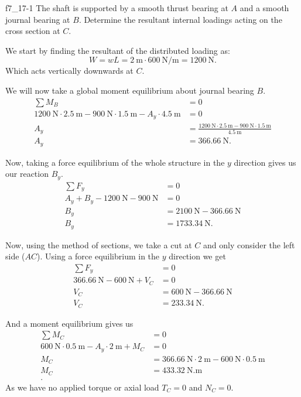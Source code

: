 
\begin{problemwithimage}{f7_1}{7-1}
  The shaft is supported by a smooth thrust bearing at $A$ and a smooth journal bearing at $B$.
  Determine the resultant internal loadings acting on the cross section at $C$.
\end{problemwithimage}

\begin{derivation}
  We start by finding the resultant of the distributed loading as:
  \begin{equation*}
    W = w L = \qty{2}{\m} \cdot \qty{600}{\N\per\m}  = \qty{1200}{\N}
  .\end{equation*}
  Which acts vertically downwards at $C$.

  We will now take a global moment equilibrium about journal bearing $B$.
  \begin{align*}
    \sum M_B &= 0 \\
    \qty{1200}{\N} \cdot \qty{2.5}{\m} - \qty{900}{\N} \cdot \qty{1.5}{\m} - A_y \cdot \qty{4.5}{\m} &= 0 \\
    A_y &= \frac{\qty{1200}{\N} \cdot \qty{2.5}{\m} - \qty{900}{\N} \cdot \qty{1.5}{\m} }{\qty{4.5}{\m} } \\
    A_y &= \qty{366,66}{\N}
  .\end{align*}

  Now, taking a force equilibrium of the whole structure in the $y$ direction gives us our reaction $B_y$.
  \begin{align*}
    \sum F_y &= 0 \\
    A_y + B_y - \qty{1200}{\N} - \qty{900}{\N} &= 0 \\
    B_y &= \qty{2100}{\N} - \qty{366.66}{\N} \\
    B_y &= \qty{1733,34}{\N}
  .\end{align*}

  Now, using the method of sections, we take a cut at $C$ and only consider the left side ($AC$).
  Using a force equilibrium in the $y$ direction we get
  \begin{align*}
    \sum F_y &= 0 \\
    \qty{366.66}{\N} - \qty{600}{\N} + V_C &= 0 \\
    V_C &= \qty{600}{\N} - \qty{366.66}{\N} \\
    V_C &= \qty{233,34}{\N}
  .\end{align*}

  And a moment equilibrium gives us
  \begin{align*}
    \sum M_C &= 0 \\
    \qty{600}{\N} \cdot \qty{0.5}{\m} - A_{y}\cdot \qty{2}{\m} + M_C &= 0 \\
    M_C &= \qty{366.66}{\N} \cdot \qty{2}{\m} - \qty{600}{\N} \cdot \qty{0.5}{\m} \\
    M_C &= \qty{433,32}{\N.\m}\\
  .\end{align*}
  As we have no applied torque or axial load $T_C = 0$ and $N_C = 0$.
\end{derivation}

